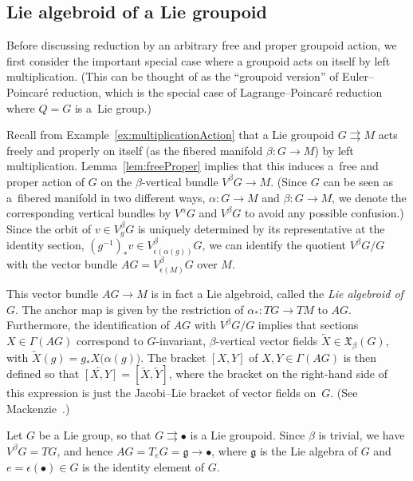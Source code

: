 \documentclass[10pt,a4paper]{amsart}
\numberwithin{equation}{section}
\begin{document}
\subsection{Lie algebroid of a Lie groupoid}

Before discussing reduction by an arbitrary free and proper groupoid action, we f\/irst consider the important special case where a groupoid
acts on itself by left multiplication. (This can be thought of as the ``groupoid version'' of Euler--Poincar\'e reduction, which is the special case of Lagrange--Poincar\'e reduction where $ Q = G $ is a~Lie group.)

Recall from Example~\ref{ex:multiplicationAction} that a Lie groupoid $ G \rightrightarrows M $ acts freely and properly on itself (as the f\/ibered manifold $ \beta \colon G \rightarrow M $) by left multiplication. Lemma~\ref{lem:freeProper} implies that this induces a~free and proper action of $G$ on the $\beta$-vertical bundle $ V ^\beta G \rightarrow M $. (Since $G$ can be seen as a~f\/ibered manifold in two dif\/ferent ways, $ \alpha \colon G \rightarrow M $ and $ \beta \colon G \rightarrow M $, we denote the corresponding vertical bundles by $ V ^\alpha G $ and $ V ^\beta G $ to avoid any possible confusion.) Since the orbit of $ v \in V ^\beta _g G $ is uniquely determined by its representative at the identity section, $ ( g ^{-1} ) _\ast v \in V ^\beta _{ \epsilon ( \alpha (g) ) } G $, we can identify the quotient $ V ^\beta G / G $ with the vector bundle $ A G = V ^\beta _{ \epsilon (M) } G $ over $M$.

This vector bundle $ A G \rightarrow M $ is in fact a Lie algebroid, called the \emph{Lie algebroid of $G$}. The anchor map is given by the restriction of $ \alpha _\ast \colon T G \rightarrow T M $ to $ A G $. Furthermore, the identif\/ication of $ A G $ with $ V ^\beta G / G $ implies that sections $ X \in \Gamma ( A G ) $ correspond to $G$-invariant, $\beta$-vertical vector f\/ields $ \overleftarrow{ X } \in \mathfrak{X} _\beta (G) $, with $ \overleftarrow{ X } (g) = g _\ast X \bigl( \alpha (g) \bigr) $. The bracket $ [ X , Y ] $ of $ X, Y \in \Gamma ( A G ) $ is then def\/ined so that $ \overleftarrow{ [X,Y] } = [ \overleftarrow{ X }, \overleftarrow{ Y }] $, where the bracket on the right-hand side of this expression is just the Jacobi--Lie bracket of vector f\/ields on~$G$. (See Mackenzie~\cite{Mackenzie2005}.)

\begin{Example}Let $G$ be a Lie group, so that $ G \rightrightarrows \bullet $ is a Lie groupoid. Since $ \beta $ is trivial, we have $ V ^\beta G = T G $, and hence $ A G = T _e G = \mathfrak{g} \rightarrow \bullet $, where $ \mathfrak{g} $ is the Lie algebra of $G$ and $ e = \epsilon ( \bullet ) \in G $ is the identity element of $G$.
\end{Example}
\end{document}

